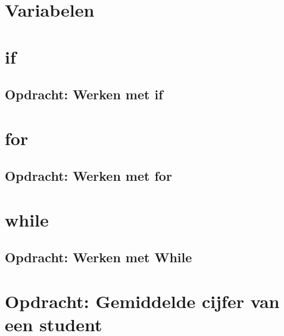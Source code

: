 \documentclass[a4paper,12pt,twoside,openright,titlepage]{book}
\begin{document}
\section{Variabelen}

\section{if}

\subsection{Opdracht: Werken met if}

\section{for}

\subsection{Opdracht: Werken met for}

\section{while}

\subsection{Opdracht: Werken met While}

\section{Opdracht: Gemiddelde cijfer van een student}


\backmatter
\printindex
\end{document}
